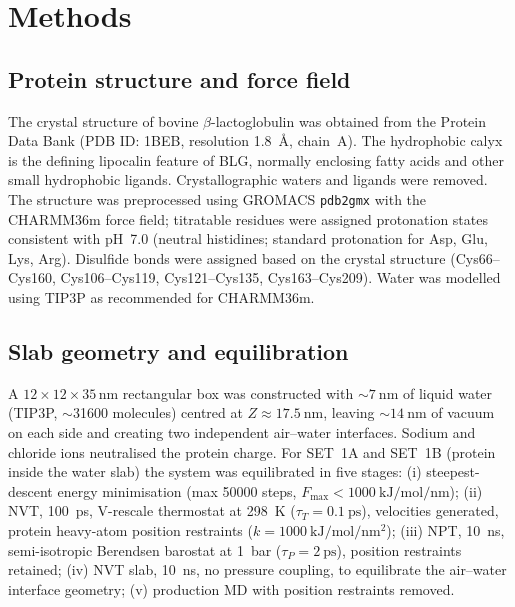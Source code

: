 \documentclass[11pt,a4paper]{article}
\begin{document}
\section*{Methods}

\subsection*{Protein structure and force field}

The crystal structure of bovine $\beta$-lactoglobulin was obtained from
the Protein Data Bank (PDB ID: 1BEB, resolution \SI{1.8}{\angstrom},
chain~A)\citep{Brownlow1997,Kontopidis2004}. The hydrophobic calyx is
the defining lipocalin feature of BLG, normally enclosing fatty acids
and other small hydrophobic ligands\citep{Loch2013}. Crystallographic waters and ligands were
removed. The structure was preprocessed using GROMACS \texttt{pdb2gmx}
with the CHARMM36m force field\citep{Huang2017}; titratable residues
were assigned protonation states consistent with pH~7.0 (neutral
histidines; standard protonation for Asp, Glu, Lys, Arg). Disulfide
bonds were assigned based on the crystal structure (Cys66--Cys160,
Cys106--Cys119, Cys121--Cys135, Cys163--Cys209). Water was modelled
using TIP3P\citep{Jorgensen1983} as recommended for CHARMM36m.

\subsection*{Slab geometry and equilibration}

A $12\times12\times35$\,\si{\nano\metre} rectangular box was constructed with
$\sim\SI{7}{\nano\metre}$ of liquid water (TIP3P, $\sim$\num{31600}
molecules) centred at $Z \approx \SI{17.5}{\nano\metre}$, leaving
$\sim\SI{14}{\nano\metre}$ of vacuum on each side and creating two
independent air--water interfaces. Sodium and chloride ions neutralised
the protein charge. For SET~1A and SET~1B (protein inside the water slab) the system was
equilibrated in five stages: (i) steepest-descent energy minimisation
(max \num{50000} steps,
$F_\mathrm{max} < \SI{1000}{\kilo\joule\per\mole\per\nano\metre}$);
(ii) NVT, \SI{100}{\pico\second}, V-rescale thermostat\citep{Bussi2007}
at \SI{298}{\kelvin} ($\tau_T = \SI{0.1}{\pico\second}$), velocities
generated, protein heavy-atom position restraints
($k = \SI{1000}{\kilo\joule\per\mole\per\nano\metre\squared}$);
(iii) NPT, \SI{10}{\nano\second}, semi-isotropic Berendsen
barostat\citep{Berendsen1984} at \SI{1}{\bar} ($\tau_P = \SI{2}{\pico\second}$),
position restraints retained;
(iv) NVT slab, \SI{10}{\nano\second}, no pressure coupling, to equilibrate
the air--water interface geometry;
(v) production MD with position restraints removed.
\end{document}
